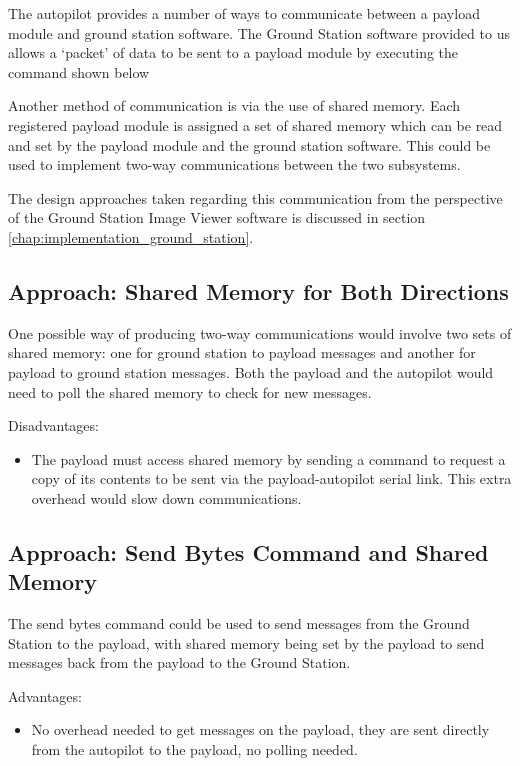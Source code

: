 The autopilot provides a number of ways to communicate between a payload module and ground station software. The Ground Station software provided to us allows a `packet' of data to be sent to a payload module by executing the command shown below

Another method of communication is via the use of shared memory. Each registered payload module is assigned a set of shared memory which can be read and set by the payload module and the ground station software. This could be used to implement two-way communications between the two subsystems.

The design approaches taken regarding this communication from the perspective of the Ground Station Image Viewer software is discussed in section \ref{chap:implementation_ground_station}.

\subsection{Approach: Shared Memory for Both Directions}
One possible way of producing two-way communications would involve two sets of shared memory: one for ground station to payload messages and another for payload to ground station messages. Both the payload and the autopilot would need to poll the shared memory to check for new messages.


Disadvantages:
\begin{itemize}
\item The payload must access shared memory by sending a command to request a copy of its contents to be sent via the payload-autopilot serial link. This extra overhead would slow down communications.
\end{itemize}


\subsection{Approach: Send Bytes Command and Shared Memory}
The send bytes command could be used to send messages from the Ground Station to the payload, with shared memory being set by the payload to send messages back from the payload to the Ground Station.

Advantages:
\begin{itemize}
\item No overhead needed to get messages on the payload, they are sent directly from the autopilot to the payload, no polling needed.
\end{itemize}

